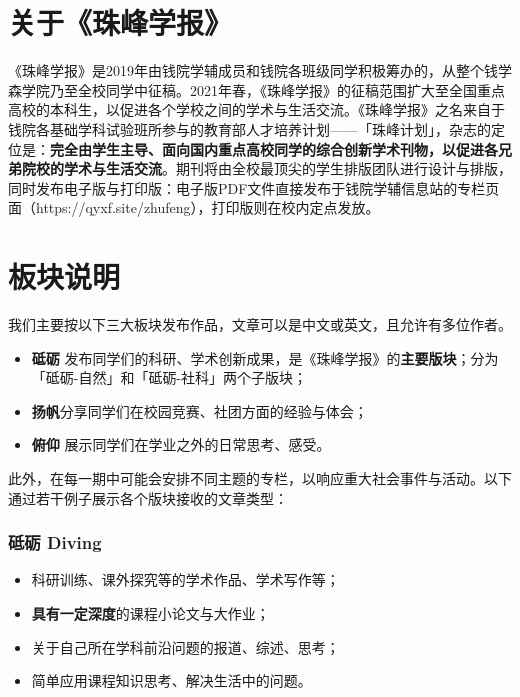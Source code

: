 \documentclass[
decoration,  %
]{qyxf-book}
\begin{document}
\begin{multicols}{2}
	
	\section*{关于《珠峰学报》}
	
    《珠峰学报》是2019年由钱院学辅成员和钱院各班级同学积极筹办的，从整个钱学森学院乃至全校同学中征稿。2021年春，《珠峰学报》的征稿范围扩大至全国重点高校的本科生，以促进各个学校之间的学术与生活交流。《珠峰学报》之名来自于钱院各基础学科试验班所参与的教育部人才培养计划——「珠峰计划」，杂志的定位是：\textbf{完全由学生主导、面向国内重点高校同学的综合创新学术刊物，以促进各兄弟院校的学术与生活交流}。期刊将由全校最顶尖的学生排版团队进行设计与排版，同时发布电子版与打印版：电子版PDF文件直接发布于钱院学辅信息站的专栏页面（https://qyxf.site/zhufeng），打印版则在校内定点发放。
	
	\section*{板块说明}
	
    我们主要按以下三大板块发布作品，文章可以是中文或英文，且允许有多位作者。
	
	\begin{itemize}%
		\item 
		\textbf{砥砺}\;\; 发布同学们的科研、学术创新成果，是《珠峰学报》的\textbf{主要版块}；分为「砥砺-自然」和「砥砺-社科」两个子版块；
		\item 
		\textbf{扬帆}\;\;分享同学们在校园竞赛、社团方面的经验与体会；
		\item 
		\textbf{俯仰}\;\; 展示同学们在学业之外的日常思考、感受。
	\end{itemize}
	
    此外，在每一期中可能会安排不同主题的专栏，以响应重大社会事件与活动。以下通过若干例子展示各个版块接收的文章类型：
	
	\subsubsection{砥砺 Diving}
	
	\begin{itemize}%
		\item
		科研训练、课外探究等的学术作品、学术写作等；
		\item
		\textbf{具有一定深度}的课程小论文与大作业；
		\item
		关于自己所在学科前沿问题的报道、综述、思考；
		\item
		简单应用课程知识思考、解决生活中的问题。
	\end{itemize}
	

\end{multicols}
\end{document}
